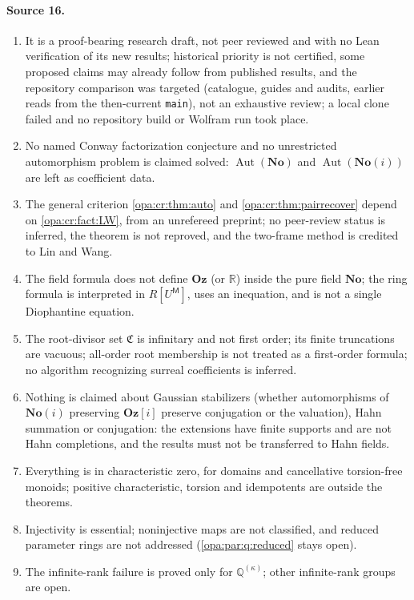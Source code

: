 \documentclass[11pt,oneside]{article}
\numberwithin{equation}{section}
\theoremstyle{definition}
\theoremstyle{remark}
\newcommand{\No}{\mathbf{No}}
\newcommand{\Oz}{\mathbf{Oz}}
\newcommand{\Og}{\mathbf{Oz}[i]}
\newcommand{\SC}{\mathbf{No}(i)}
\newcommand{\R}{\mathbb R}
\newcommand{\Q}{\mathbb Q}
\newcommand{\Aut}{\operatorname{Aut}}
\begin{document}
\paragraph{Source 16.}
\begin{enumerate}[itemsep=1pt]
\item It is a proof-bearing research draft, not peer reviewed and with no Lean verification of its new results;
historical priority is not certified, some proposed claims may already follow from published results, and the
repository comparison was targeted (catalogue, guides and audits, earlier reads from the then-current
\texttt{main}), not an exhaustive review; a local clone failed and no repository build or Wolfram run took place.
\item No named Conway factorization conjecture and no unrestricted automorphism problem is claimed solved:
$\Aut(\No)$ and $\Aut(\SC)$ are left as coefficient data.
\item The general criterion \cref{opa:cr:thm:auto} and \cref{opa:cr:thm:pairrecover} depend on
\cref{opa:cr:fact:LW}, from an unrefereed preprint; no peer-review status is inferred, the theorem is not reproved,
and the two-frame method is credited to Lin and Wang.
\item The field formula does not define $\Oz$ (or $\R$) inside the pure field $\No$; the ring formula is
interpreted in $R[U^{\mathsf M}]$, uses an inequation, and is not a single Diophantine equation.
\item The root-divisor set $\mathfrak C$ is infinitary and not first order; its finite truncations are vacuous;
all-order root membership is not treated as a first-order formula; no algorithm recognizing surreal coefficients
is inferred.
\item Nothing is claimed about Gaussian stabilizers (whether automorphisms of $\SC$ preserving $\Og$ preserve
conjugation or the valuation), Hahn summation or conjugation: the extensions have finite supports and are not Hahn
completions, and the results must not be transferred to Hahn fields.
\item Everything is in characteristic zero, for domains and cancellative torsion-free monoids; positive
characteristic, torsion and idempotents are outside the theorems.
\item Injectivity is essential; noninjective maps are not classified, and reduced parameter rings are not
addressed (\cref{opa:par:q:reduced} stays open).
\item The infinite-rank failure is proved only for $\Q^{(\kappa)}$; other infinite-rank groups are open.

\end{enumerate}
\end{document}
